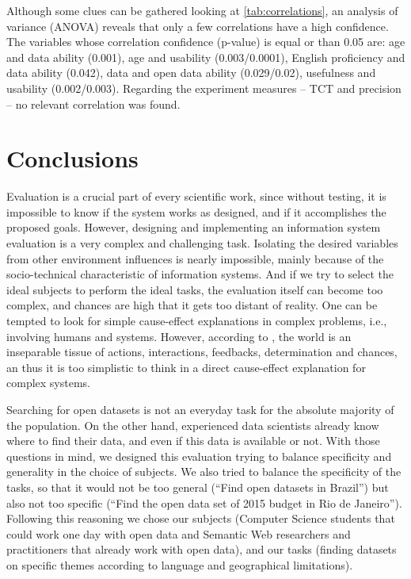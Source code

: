 Although some clues can be gathered looking at \autoref{tab:correlations}, an analysis of variance (ANOVA) reveals that only a few correlations have a high confidence.
The variables whose correlation confidence (p-value) is equal or than 0.05 are: age and data ability (0.001), age and usability (0.003/0.0001), English proficiency and data ability (0.042), data and open data ability (0.029/0.02), usefulness and usability (0.002/0.003).
Regarding the experiment measures -- TCT and precision -- no relevant correlation was found.

\section{Conclusions}
\label{sec:conclusion}


Evaluation is a crucial part of every scientific work, since without testing, it is impossible to know if the system works as designed, and if it accomplishes the proposed goals.
However, designing and implementing an information system evaluation is a very complex and challenging task.
Isolating the desired variables from other environment influences is nearly impossible, mainly because of the socio-technical characteristic of information systems.
And if we try to select the ideal subjects to perform the ideal tasks, the evaluation itself can become too complex, and chances are high that it gets too distant of reality.
One can be tempted to look for simple cause-effect explanations in complex problems, i.e., involving humans and systems.
However, according to , the world is an inseparable tissue of actions, interactions, feedbacks, determination and chances, an thus it is too simplistic to think in a direct cause-effect explanation for complex systems.

Searching for open datasets is not an everyday task for the absolute majority of the population.
On the other hand, experienced data scientists already know where to find their data, and even if this data is available or not.
With those questions in mind, we designed this evaluation trying to balance specificity and generality in the choice of subjects.
We also tried to balance the specificity of the tasks, so that it would not be too general (``Find open datasets in Brazil'') but also not too specific (``Find the open data set of 2015 budget in Rio de Janeiro'').
Following this reasoning we chose our subjects (Computer Science students that could work one day with open data and Semantic Web researchers and practitioners that already work with open data), and our tasks (finding datasets on specific themes according to language and geographical limitations).

